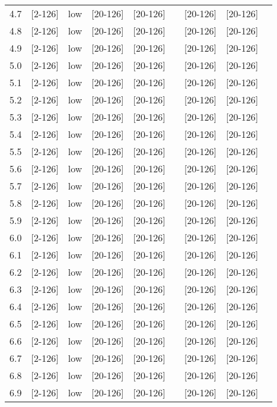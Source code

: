 \documentclass{article}
\begin{document}
\begin{tabular}{| c | c | c | c | c | c | c | c | c |}
      4.7 & [2-126] & low & [20-126] & [20-126] &  & [20-126] & [20-126] &\\
      4.8 & [2-126] & low & [20-126] & [20-126] &  & [20-126] & [20-126] &\\
      4.9 & [2-126] & low & [20-126] & [20-126] &  & [20-126] & [20-126] &\\
      5.0 & [2-126] & low & [20-126] & [20-126] &  & [20-126] & [20-126] &\\
      5.1 & [2-126] & low & [20-126] & [20-126] &  & [20-126] & [20-126] &\\
      5.2 & [2-126] & low & [20-126] & [20-126] &  & [20-126] & [20-126] &\\
      5.3 & [2-126] & low & [20-126] & [20-126] &  & [20-126] & [20-126] &\\
      5.4 & [2-126] & low & [20-126] & [20-126] &  & [20-126] & [20-126] &\\
      5.5 & [2-126] & low & [20-126] & [20-126] &  & [20-126] & [20-126] &\\
      5.6 & [2-126] & low & [20-126] & [20-126] &  & [20-126] & [20-126] &\\
      5.7 & [2-126] & low & [20-126] & [20-126] &  & [20-126] & [20-126] &\\
      5.8 & [2-126] & low & [20-126] & [20-126] &  & [20-126] & [20-126] &\\
      5.9 & [2-126] & low & [20-126] & [20-126] &  & [20-126] & [20-126] &\\
      6.0 & [2-126] & low & [20-126] & [20-126] &  & [20-126] & [20-126] &\\
      6.1 & [2-126] & low & [20-126] & [20-126] &  & [20-126] & [20-126] &\\
      6.2 & [2-126] & low & [20-126] & [20-126] &  & [20-126] & [20-126] &\\
      6.3 & [2-126] & low & [20-126] & [20-126] &  & [20-126] & [20-126] &\\
      6.4 & [2-126] & low & [20-126] & [20-126] &  & [20-126] & [20-126] &\\
      6.5 & [2-126] & low & [20-126] & [20-126] &  & [20-126] & [20-126] &\\
      6.6 & [2-126] & low & [20-126] & [20-126] &  & [20-126] & [20-126] &\\
      6.7 & [2-126] & low & [20-126] & [20-126] &  & [20-126] & [20-126] &\\
      6.8 & [2-126] & low & [20-126] & [20-126] &  & [20-126] & [20-126] &\\
      6.9 & [2-126] & low & [20-126] & [20-126] &  & [20-126] & [20-126] &\\

\end{tabular}
\end{document}
